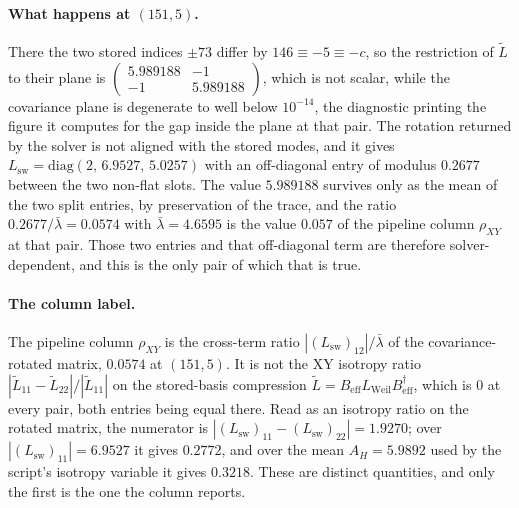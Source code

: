 \documentclass[11pt,a4paper]{article}
\begin{document}
    \paragraph{What happens at $(151,5)$.}
      There the two stored indices $\pm 73$ differ by $146 \equiv -5 \equiv -c$, so the restriction
      of $\tilde L$ to their plane is
      $\begin{pmatrix} 5.989188 & -1 \\ -1 & 5.989188 \end{pmatrix}$, which is not scalar, while
      the covariance plane is degenerate to well below $10^{-14}$, the diagnostic printing the
      figure it computes for the gap inside the plane at that pair.
      The rotation returned by the solver is not aligned with the stored modes, and it gives
      $L_{\mathrm{sw}} = \mathrm{diag}(2,\, 6.9527,\, 5.0257)$ with an off-diagonal entry of
      modulus $0.2677$ between the two non-flat slots.
      The value $5.989188$ survives only as the mean of the two split entries, by preservation of
      the trace, and the ratio $0.2677/\bar\lambda = 0.0574$ with $\bar\lambda = 4.6595$ is the
      value $0.057$ of the pipeline column $\rho_{XY}$ at that pair.
      Those two entries and that off-diagonal term are therefore solver-dependent, and this is the
      only pair of which that is true.

    \paragraph{The column label.}
      The pipeline column $\rho_{XY}$ is the cross-term ratio
      $|(L_{\mathrm{sw}})_{12}|/\bar\lambda$ of the covariance-rotated matrix, $0.0574$ at
      $(151,5)$.
      It is not the XY isotropy ratio $|\tilde L_{11} - \tilde L_{22}|/|\tilde L_{11}|$ on the
      stored-basis compression $\tilde L = B_{\mathrm{eff}} L_{\mathrm{Weil}} B_{\mathrm{eff}}^\dagger$,
      which is $0$ at every pair, both entries being equal there.
      Read as an isotropy ratio on the rotated matrix, the numerator is
      $|(L_{\mathrm{sw}})_{11} - (L_{\mathrm{sw}})_{22}| = 1.9270$; over
      $|(L_{\mathrm{sw}})_{11}| = 6.9527$ it gives $0.2772$, and over the mean $A_H = 5.9892$ used by
      the script's isotropy variable it gives $0.3218$.
      These are distinct quantities, and only the first is the one the column reports.
\end{document}
